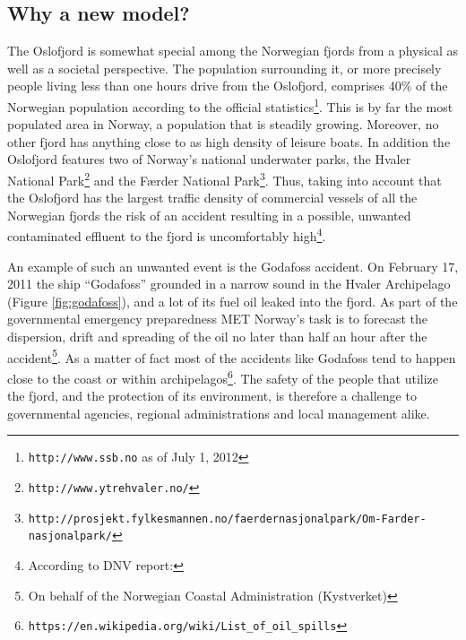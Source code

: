 \subsection{Why a new model?}
\label{subsec:why}
The Oslofjord is somewhat special among the Norwegian fjords from a physical as well as a societal perspective. The population surrounding it, or more precisely people living less than one hours drive from the Oslofjord, comprises 40\% of the Norwegian population according to the official statistics\footnote{\texttt{http://www.ssb.no} as of July 1, 2012}. This is by far the most populated area in Norway, a population that is steadily growing. Moreover, no other fjord has anything close to as high density of leisure boats. In addition the Oslofjord features two of Norway's national underwater parks, the Hvaler National Park\footnote{\texttt{http://www.ytrehvaler.no/}} and the F{\ae}rder National Park\footnote{\texttt{http://prosjekt.fylkesmannen.no/faerdernasjonalpark/Om-Farder-nasjonalpark/}}. Thus, taking into account that the Oslofjord has the largest traffic density of commercial vessels of all the Norwegian fjords the risk of an accident resulting in a possible, unwanted contaminated effluent to the fjord is uncomfortably high\footnote{According to DNV report: \texttt{}}. 
 

An example of such an unwanted event is the Godafoss accident. On February 17, 2011 the ship ``Godafoss'' grounded in a narrow sound in the Hvaler Archipelago (Figure \ref{fig:godafoss}), and a lot of its fuel oil leaked into the fjord. As part of the governmental emergency preparedness MET Norway's task is to forecast the dispersion, drift and spreading of the oil no later than half an hour after the accident\footnote{On behalf of the Norwegian Coastal Administration (Kystverket)}. As a matter of fact most of the accidents like Godafoss tend to happen close to the coast or within archipelagos\footnote{\texttt{https://en.wikipedia.org/wiki/List\_of\_oil\_spills}}. The safety of the people that utilize the fjord, and the protection of its environment, is therefore a challenge to governmental agencies, regional administrations and local management alike. 

